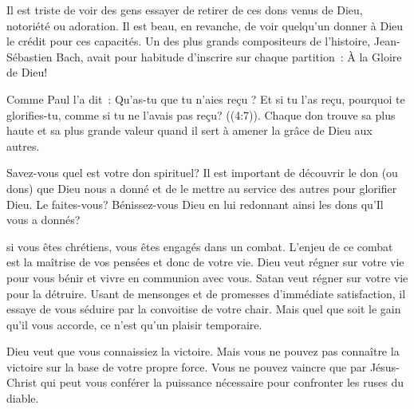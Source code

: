 
Il est triste de voir des gens essayer de retirer de ces dons venus de Dieu,
 notoriété ou adoration. Il est beau, en revanche, de voir quelqu'un donner
 à Dieu le crédit pour ces capacités.
 Un des plus grands compositeurs de l'histoire, Jean-Sébastien Bach,
 avait pour habitude d'inscrire sur chaque partition~: 
 \og À la Gloire de Dieu! \fg{}

Comme Paul l'a dit~: 
 \og Qu'as-tu que tu n'aies reçu ? Et si tu l'as reçu,
 pourquoi te glorifies-tu, comme si tu ne l'avais pas reçu?
 ((4:7)).
 Chaque don trouve sa plus haute et sa plus grande valeur
 quand il sert à amener la grâce de Dieu aux autres.

Savez-vous quel est votre don spirituel? Il est important de découvrir le don
 (ou dons) que Dieu nous a donné et de le mettre au service des autres
 pour glorifier Dieu. Le faites-vous? Bénissez-vous Dieu en lui redonnant
 ainsi les dons qu'Il vous a donnés?

\dvrule








 si vous êtes chrétiens,
 vous êtes engagés dans un combat. L'enjeu de ce combat est la maîtrise
 de vos pensées et donc de votre vie. Dieu veut régner sur votre vie
 pour vous bénir et vivre en communion avec vous.
 Satan veut régner sur votre vie pour la détruire.
 Usant de mensonges et de promesses d'immédiate satisfaction,
 il essaye de vous séduire par la convoitise de votre chair.
 Mais quel que soit le gain qu'il vous accorde,
 ce n'est qu'un plaisir temporaire.


Dieu veut que vous connaissiez la victoire. Mais vous ne pouvez pas connaître
 la victoire sur la base de votre propre force. Vous ne pouvez vaincre
 que par Jésus-Christ qui peut vous conférer la puissance nécessaire pour
 confronter les ruses du diable.

